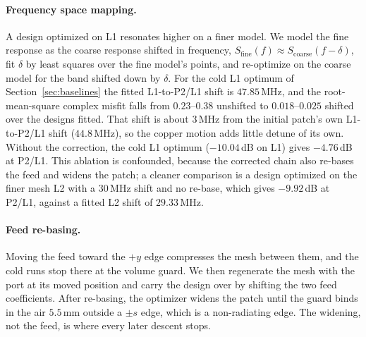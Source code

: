 \documentclass{anvil-paper}
\newcommand{\PL}{P2/L1}
\begin{document}
\paragraph{Frequency space mapping.}
A design optimized on L1 resonates higher on a finer model. We model the
fine response as the coarse response shifted in frequency,
$S_{\mathrm{fine}}(f) \approx S_{\mathrm{coarse}}(f - \delta)$, fit $\delta$
by least squares over the fine model's points, and re-optimize on the coarse
model for the band shifted down by $\delta$. For the cold L1 optimum of
Section~\ref{sec:baselines} the fitted L1-to-\PL{} shift is $47.85$\,MHz, and
the root-mean-square complex misfit falls from $0.23$--$0.38$ unshifted to
$0.018$--$0.025$ shifted over the designs fitted. That shift is about
$3$\,MHz from the initial patch's own L1-to-\PL{} shift ($44.8$\,MHz), so the
copper motion adds little detune of its own. Without the correction, the
cold L1 optimum ($-10.04$\,dB on L1) gives $-4.76$\,dB at \PL. This
ablation is confounded, because the corrected chain also re-bases the feed
and widens the patch; a cleaner comparison is a design optimized on the
finer mesh L2 with a $30$\,MHz shift and no re-base, which gives
$-9.92$\,dB at \PL, against a fitted L2 shift of $29.33$\,MHz.

\paragraph{Feed re-basing.}
Moving the feed toward the $+y$ edge compresses the mesh between them, and
the cold runs stop there at the volume guard. We then regenerate the mesh
with the port at its moved position and carry the design over by shifting
the two feed coefficients. After re-basing, the optimizer widens the patch
until the guard binds in the air $5.5$\,mm outside a $\pm s$ edge, which is
a non-radiating edge. The widening, not the feed, is where every later
descent stops.
\end{document}
